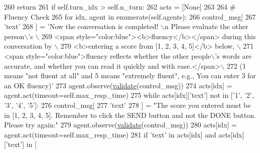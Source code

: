 \begin{DoxyCode}
260                         \textcolor{keywordflow}{return}
261                 \textcolor{keywordflow}{if} self.turn\_idx > self.n\_turn:
262                     acts = [\textcolor{keywordtype}{None}]
263 
264                     \textcolor{comment}{# Fluency Check}
265                     \textcolor{keywordflow}{for} idx, agent \textcolor{keywordflow}{in} enumerate(self.agents):
266                         control\_msg[
267                             \textcolor{stringliteral}{'text'}
268                         ] = \textcolor{stringliteral}{'Now the conversation is completed! \(\backslash\)n Please evaluate the other person\(\backslash\)'s \(\backslash\)}
269 \textcolor{stringliteral}{                                               <span style="color:blue"><b>fluency</b></span> during this
       conversation by \(\backslash\)}
270 \textcolor{stringliteral}{                                               <b>entering a score from [1, 2, 3, 4, 5]</b> below, \(\backslash\)}
271 \textcolor{stringliteral}{                                               <span style="color:blue">fluency reflects whether the other
       people\(\backslash\)'s words are accurate, and whether you can read it quickly and with ease.</span>\(\backslash\)}
272 \textcolor{stringliteral}{                                               (1 means "not fluent at all" and 5 means "extremely fluent",
       e.g., You can enter 3 for an OK fluency)'}
273                         agent.observe(\hyperlink{namespaceparlai_1_1core_1_1worlds_afc3fad603b7bce41dbdc9cdc04a9c794}{validate}(control\_msg))
274                         acts[idx] = agent.act(timeout=self.max\_resp\_time)
275                         \textcolor{keywordflow}{while} acts[idx][\textcolor{stringliteral}{'text'}] \textcolor{keywordflow}{not} \textcolor{keywordflow}{in} [\textcolor{stringliteral}{'1'}, \textcolor{stringliteral}{'2'}, \textcolor{stringliteral}{'3'}, \textcolor{stringliteral}{'4'}, \textcolor{stringliteral}{'5'}]:
276                             control\_msg[
277                                 \textcolor{stringliteral}{'text'}
278                             ] = \textcolor{stringliteral}{"The score you entered must be in [1, 2, 3, 4, 5]. Remember to click the
       SEND button and not the DONE button. Please try again:"}
279                             agent.observe(\hyperlink{namespaceparlai_1_1core_1_1worlds_afc3fad603b7bce41dbdc9cdc04a9c794}{validate}(control\_msg))
280                             acts[idx] = agent.act(timeout=self.max\_resp\_time)
281                         \textcolor{keywordflow}{if} \textcolor{stringliteral}{'text'} \textcolor{keywordflow}{in} acts[idx] \textcolor{keywordflow}{and} acts[idx][\textcolor{stringliteral}{'text'}] \textcolor{keywordflow}{in} [

\end{DoxyCode}
